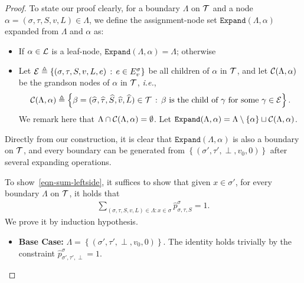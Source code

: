 \documentclass[11pt]{article}
\newcommand{\set}[1]{\left\{#1\right\}}
\newcommand{\defeq}{\triangleq} \renewcommand{\d}{\,\-d}
\def\!#1{\mathtt{#1}}
\def\IE{\emph{i.e.}}
\newcommand{\wh}[1]{\widehat{#1}}
\def\Expand{\!{Expand}}
\begin{document}
\begin{proof}
    {
    \color{blue}
    To state our proof clearly, for a boundary $\Lambda$ on $\mathcal{T}$ and a node $\alpha = (\sigma, \tau, S, v, L) \in \Lambda$, we define the assignment-node set $\Expand(\Lambda, \alpha)$ expanded from $\Lambda$ and $\alpha$ as:
    \begin{itemize}
        \item If $\alpha \in \mathcal{L}$ is a leaf-node, $\Expand(\Lambda, \alpha) = \Lambda$; otherwise
        \item Let $\+E \defeq \set{(\sigma, \tau, S, v, L, e) \cmid e \in E_v^\sigma}$ be all children of $\alpha$ in $\mathcal{T}$, and let $\mathcal{C}(\Lambda, \alpha)$ be the grandson nodes of $\alpha$ in $\mathcal{T}$, \IE,
        $$
            \+C(\Lambda, \alpha) \defeq \set{\beta = (\wh{\sigma}, \wh{\tau}, \wh{S}, \wh{v}, \wh{L}) \in \+T \cmid \mbox{$\beta$ is the child of $\gamma$ for some $\gamma \in \+E$}}.
        $$
        We remark here that $\Lambda \cap \mathcal{C}(\Lambda, \alpha) = \emptyset$. Let $\Expand(\Lambda, \alpha) = \Lambda \setminus \set{\alpha} \sqcup \+C(\Lambda, \alpha)$.
    \end{itemize}

    Directly from our construction, it is clear that $\Expand(\Lambda, \alpha)$ is also a boundary on $\mathcal{T}$, and every boundary can be generated from $\set{(\sigma', \tau', \perp, v_0, 0)}$ after several expanding operations.
    }
    
    To show~\eqref{eqn-sum-leftside}, it suffices to show that given $x \in \sigma'$, for every boundary $\Lambda$ on $\mathcal{T}$, it holds that
    \begin{align} \label{eq:extend-version-of-identity}
        \sum_{(\sigma, \tau, S, v, L) \in \Lambda : x \in \sigma} \wh{p}_{\sigma, \tau, S}^{\sigma} = 1.
    \end{align}
    We prove it by induction hypothesis.
    \begin{itemize}
        \item \textbf{Base Case:} $\Lambda = \set{(\sigma', \tau', \perp, v_0, 0)}$. The identity holds trivially by the constraint $\wh{p}_{\sigma', \tau', \perp}^\sigma = 1$.


\end{itemize}
\end{proof}
\end{document}
